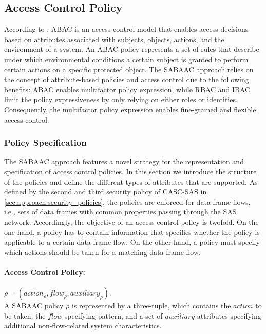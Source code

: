 \subsection{Access Control Policy}
\label{sec:approach:sabaac:policy}
According to \citeauthor{Hu2014} \cite{Hu2014}, ABAC is an access control model that enables access decisions based on attributes associated with subjects, objects, actions, and the environment of a system.
An ABAC policy represents a set of rules that describe under which environmental conditions a certain subject is granted to perform certain actions on a specific protected object.
The SABAAC approach relies on the concept of attribute-based policies and access control due to the following benefits:
ABAC enables multifactor policy expression, while RBAC and IBAC limit the policy expressiveness by only relying on either roles or identities.
Consequently, the multifactor policy expression enables fine-grained and flexible access control.

\subsubsection{Policy Specification}
The SABAAC approach features a novel strategy for the representation and specification of access control policies.
In this section we introduce the structure of the policies and define the different types of attributes that are supported.
As defined by the second and third security policy of CASC-SAS in \autoref{sec:approach:security_policies}, the policies are enforced for data frame flows, i.e., sets of data frames with common properties passing through the SAS network.
Accordingly, the objective of an access control policy is twofold.
On the one hand, a policy has to contain information that specifies whether the policy is applicable to a certain data frame flow.
On the other hand, a policy must specify which actions should be taken for a matching data frame flow.

\paragraph{Access Control Policy:} $\rho = (action_{\rho}, flow_{\rho}, auxiliary_{\rho})$.\\
A SABAAC policy $\rho$ is represented by a three-tuple, which contains the $action$ to be taken, the $flow$-specifying pattern, and a set of $auxiliary$ attributes specifying additional non-flow-related system characteristics.

